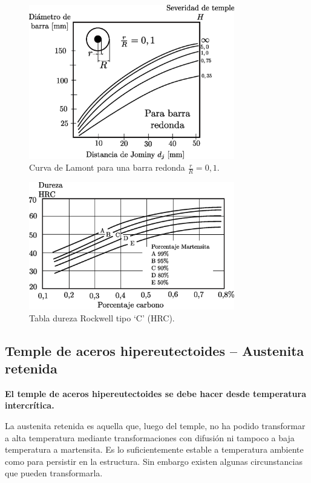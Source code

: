 \documentclass{article}
\begin{document}
 

\begin{figure}[htb!]
    \centering
    \includegraphics[width=0.8\textwidth]{fig/lamont.eps}
    \caption{Curva de Lamont para una barra redonda $\frac{r}{R}=0,1$.}
    \label{fig:lamont}
\end{figure}


\begin{figure}[htb!]
    \centering
    \includegraphics[width=0.8\textwidth]{fig/HRCdiag.eps}
    \caption{Tabla dureza Rockwell tipo `C' (HRC).}
    \label{fig:rockewell}
\end{figure}

\subsection{Temple de aceros hipereutectoides -- Austenita retenida}
\textbf{El temple de aceros hipereutectoides se debe hacer desde temperatura intercrítica.}

La austenita retenida es aquella que, luego del temple, no ha podido transformar a alta temperatura mediante transformaciones con difusión ni tampoco a baja temperatura a martensita. Es lo suficientemente estable a temperatura ambiente como para persistir en la estructura. Sin embargo existen algunas circunstancias que pueden transformarla.
\end{document}
